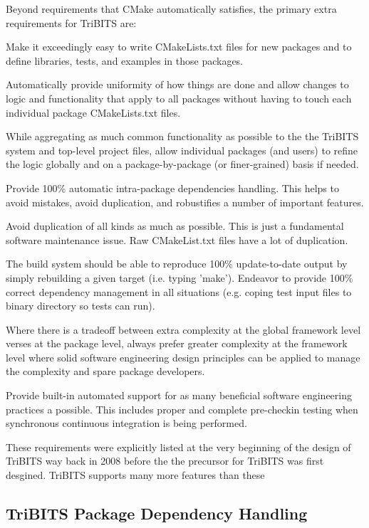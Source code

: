 \documentclass[note]{TechNote}
\begin{document}
Beyond requirements that CMake automatically satisfies, the primary extra requirements for TriBITS are:
\begin{compactitem}
\item Make it exceedingly easy to write CMakeLists.txt files for new packages and to define libraries, tests, and examples in those packages.
\item Automatically provide uniformity of how things are done and allow changes to logic and functionality that apply to all  packages without having to touch each individual package CMakeLists.txt files.
\item While aggregating as much common functionality as possible to the the TriBITS system and top-level project files, allow individual packages (and users) to refine the logic globally and on a package-by-package (or finer-grained) basis if needed.
\item Provide 100\% automatic intra-package dependencies handling.  This helps to avoid mistakes, avoid duplication, and robustifies a number of important features.
\item Avoid duplication of all kinds as much as possible.  This is just a fundamental software maintenance issue.  Raw CMakeList.txt files have a lot of duplication.
\item The build system should be able to reproduce 100\% update-to-date output by simply rebuilding a given target (i.e. typing 'make').  Endeavor to provide 100\% correct dependency management in all situations (e.g. coping test input files to binary directory so tests can run).
\item Where there is a tradeoff between extra complexity at the global framework level verses at the package level, always prefer greater complexity at the framework level where solid software engineering design principles can be applied to manage the complexity and spare package developers.
\item Provide built-in automated support for as many beneficial software engineering practices a possible.  This includes proper and complete pre-checkin testing when synchronous continuous integration is being performed.
\end{compactitem}

These requirements were explicitly listed at the very beginning of the design of TriBITS way back in 2008 before the the precursor for TriBITS was first desgined.  TriBITS supports many more features than these 

%
\subsection{TriBITS Package Dependency Handling}
%
\end{document}

